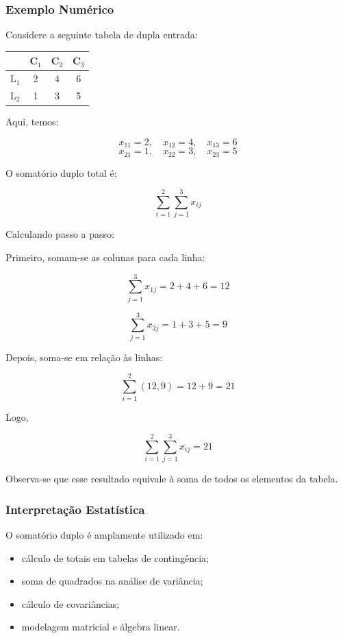 \subsubsection*{Exemplo Numérico}

Considere a seguinte tabela de dupla entrada:

\begin{center}
\begin{tabular}{c|ccc}
\hline
 & C$_1$ & C$_2$ & C$_3$ \\
\hline
L$_1$ & 2 & 4 & 6 \\
L$_2$ & 1 & 3 & 5 \\
\hline
\end{tabular}
\end{center}

Aqui, temos:

\[
x_{11}=2, \quad x_{12}=4, \quad x_{13}=6
\]
\[
x_{21}=1, \quad x_{22}=3, \quad x_{23}=5
\]

O somatório duplo total é:

\[
\sum_{i=1}^{2} \sum_{j=1}^{3} x_{ij}
\]

Calculando passo a passo: \vskip0.3cm

Primeiro, somam-se as colunas para cada linha:

\[
\sum_{j=1}^{3} x_{1j} = 2+4+6 = 12
\]

\[
\sum_{j=1}^{3} x_{2j} = 1+3+5 = 9
\]

Depois, soma-se em relação às linhas:

\[
\sum_{i=1}^{2} (12, 9) = 12 + 9 = 21
\]

Logo,

\[
\sum_{i=1}^{2} \sum_{j=1}^{3} x_{ij} = 21
\]

Observa-se que esse resultado equivale à soma de todos os elementos da tabela.

\subsubsection*{Interpretação Estatística}

O somatório duplo é amplamente utilizado em:

\begin{itemize}
\item cálculo de totais em tabelas de contingência;
\item soma de quadrados na análise de variância;
\item cálculo de covariâncias;
\item modelagem matricial e álgebra linear.
\end{itemize}

